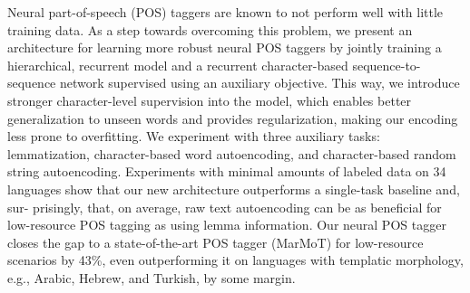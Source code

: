 Neural part-of-speech (POS) taggers are known to not perform well with little training data. As a step towards overcoming this problem, we present an architecture for learning more robust neural POS taggers by jointly training a hierarchical, recurrent model and a recurrent character-based sequence-to-sequence network supervised using an auxiliary objective. This way, we introduce stronger character-level supervision into the model, which enables better generalization to unseen words and provides regularization, making our encoding less prone to overfitting. We experiment with three auxiliary tasks: lemmatization, character-based word autoencoding, and character-based random string autoencoding. Experiments with minimal amounts of labeled data on 34 languages show that our new architecture outperforms a single-task baseline and, sur- prisingly, that, on average, raw text autoencoding can be as beneficial for low-resource POS tagging as using lemma information. Our neural POS tagger closes the gap to a state-of-the-art POS tagger (MarMoT) for low-resource scenarios by 43\%, even outperforming it on languages with templatic morphology, e.g., Arabic, Hebrew, and Turkish, by some margin.
